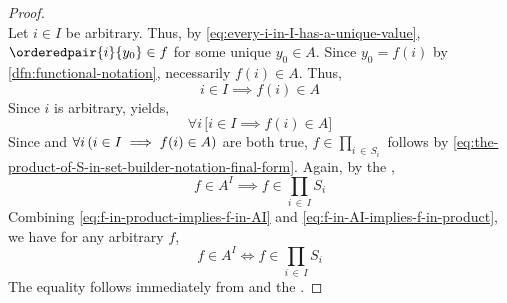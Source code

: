 \begin{proof}
\begin{equation}
    \end{equation}
    Let \( i \in I \) be arbitrary. Thus, by \eqref{eq:every-i-in-I-has-a-unique-value}, \( \orderedpair{i}{y_{0}} \in f \)
    for some unique \( y_{0} \in A \). Since \( y_{0} = f(i) \) by \cref{dfn:functional-notation}, necessarily \( f(i) \in A \).
    Thus,
    \begin{equation*}
        i \in I \implies f(i) \in A
    \end{equation*}
    Since \( i \) is arbitrary,  yields,
    \begin{equation*}
        \forall i \, \Big[ i \in I \implies f(i) \in A \Big]
    \end{equation*}
    Since  and \( \forall i \, \mleft( i \in I \implies f(i) \in A \mright) \) are both true,
    \( f \in \prod_{i \,\in\, S_{i}} \) follows by \eqref{eq:the-product-of-S-in-set-builder-notation-final-form}.
    Again, by the ,
    \begin{equation}
        \label{eq:f-in-AI-implies-f-in-product}
        f \in A^{I} \implies f \in \prod_{i \,\in\, I} S_{i}
    \end{equation}
    Combining \eqref{eq:f-in-product-implies-f-in-AI} and \eqref{eq:f-in-AI-implies-f-in-product},
    we have for any arbitrary \( f \),
    \begin{equation*}
            f \in A^{I} \iff f \in \prod_{i \,\in\, I} S_{i}
    \end{equation*}
    The equality follows immediately from  and the .
\end{proof}
